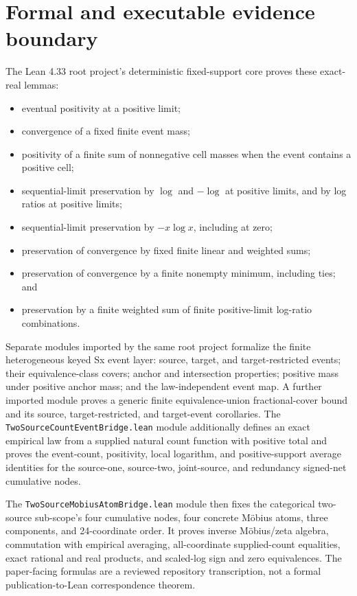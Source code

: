 \documentclass[11pt]{article}
\theoremstyle{definition}
\begin{document}
\section{Formal and executable evidence boundary}\label{sec:evidence-boundary}

The Lean 4.33 root project's deterministic fixed-support core proves these exact-real lemmas:
\begin{itemize}
  \item eventual positivity at a positive limit;
  \item convergence of a fixed finite event mass;
  \item positivity of a finite sum of nonnegative cell masses when the event contains a positive
    cell;
  \item sequential-limit preservation by $\log$ and $-\log$ at positive limits, and by log ratios
    at positive limits;
  \item sequential-limit preservation by $-x\log x$, including at zero;
  \item preservation of convergence by fixed finite linear and weighted sums;
  \item preservation of convergence by a finite nonempty minimum, including ties; and
  \item preservation by a finite weighted sum of finite positive-limit log-ratio combinations.
\end{itemize}
Separate modules imported by the same root project formalize the finite heterogeneous keyed Sx
event layer: source, target, and target-restricted events; their equivalence-class covers; anchor
and intersection properties; positive mass under positive anchor mass; and the law-independent
event map.  A further imported module proves a generic finite equivalence-union fractional-cover
bound and its source, target-restricted, and target-event corollaries.  The
\texttt{TwoSourceCountEventBridge.lean} module additionally defines an exact empirical law from a
supplied natural count function with positive total and proves the event-count, positivity, local
logarithm, and positive-support average identities for the source-one, source-two, joint-source,
and redundancy signed-net cumulative nodes.

The \texttt{TwoSourceMobiusAtomBridge.lean} module then fixes the categorical two-source
sub-scope's four cumulative nodes, four concrete M{\"o}bius atoms, three components, and
24-coordinate order.  It proves inverse M{\"o}bius/zeta algebra, commutation with empirical
averaging, all-coordinate supplied-count equalities, exact rational and real products, and
scaled-log sign and zero equivalences.  The paper-facing formulas are a reviewed repository
transcription, not a formal publication-to-Lean correspondence theorem.
\end{document}

